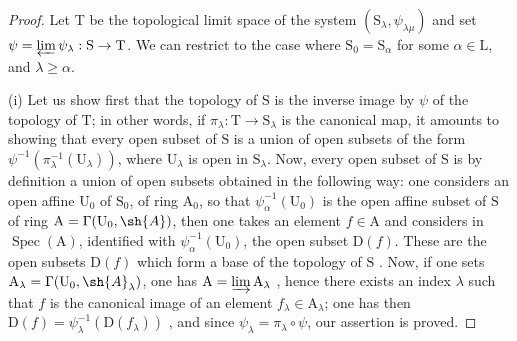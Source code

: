 \begin{proof}
Let $\mathrm{T}$ be the topological limit space of the system $(\mathrm{S}_\lambda,\psi_{\lambda\mu})$ and set $\psi=\varprojlim\psi_\lambda:\mathrm{S}\to\mathrm{T}$.
We can restrict to the case where $\mathrm{S}_0=\mathrm{S}_\alpha$ for some $\alpha\in\mathrm{L}$, and $\lambda\geqslant\alpha$.

\medskip
\noindent
(i) Let us show first that the topology of $\mathrm{S}$ is the inverse image by $\psi$ of the topology of $\mathrm{T}$; in other words, if $\pi_\lambda:\mathrm{T}\to\mathrm{S}_\lambda$ is the canonical map, it amounts to showing that every open subset of $\mathrm{S}$ is a union of open subsets of the form $\psi^{-1}(\pi_\lambda^{-1}(\mathrm{U}_\lambda))$, where $\mathrm{U}_\lambda$ is open in $\mathrm{S}_\lambda$.
Now, every open subset of $\mathrm{S}$ is by definition a union of open subsets obtained in the following way: one considers an open affine $\mathrm{U}_0$ of $\mathrm{S}_0$, of ring $\mathrm{A}_0$, so that $\psi_\alpha^{-1}(\mathrm{U}_0)$ is the open affine subset of $\mathrm{S}$ of ring $\mathrm{A}=\Gamma(\mathrm{U}_0,\sh{A})$, then one takes an element $f\in\mathrm{A}$ and considers in $\operatorname{Spec}(\mathrm{A})$, identified with $\psi_\alpha^{-1}(\mathrm{U}_0)$, the open subset $\mathrm{D}(f)$.
These are the open subsets $\mathrm{D}(f)$ which form a base of the topology of $\mathrm{S}$ .
Now, if one sets $\mathrm{A}_\lambda=\Gamma(\mathrm{U}_0,\sh{A}_\lambda)$, one has $\mathrm{A}=\varinjlim\mathrm{A}_\lambda$ , hence there exists an index $\lambda$ such that $f$ is the canonical image of an element $f_\lambda\in\mathrm{A}_\lambda$; one has then $\mathrm{D}(f)=\psi_\lambda^{-1}(\mathrm{D}(f_\lambda))$ , and since $\psi_\lambda=\pi_\lambda\circ\psi$, our assertion is proved.


\end{proof}

